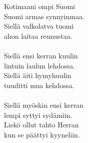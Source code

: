 
Kotimaani ompi Suomi \\ Suomi armas synnyinmaa. \\ Siellä valkolatva tuomi  \\ ahon laitaa reunustaa. \\ \hspace{10mm} \\ Siellä ensi kerran kuulin  \\ lintuin laulun lehdossa. \\ Siellä äiti hymyhuulin  \\ tuuditti mua kehdossa. \\ \hspace{10mm} \\ Siellä myöskin ensi kerran  \\ lempi syttyi sydämiin. \\ Liekö ollut tahto Herran  \\ kun se päättyi kyyneliin.
